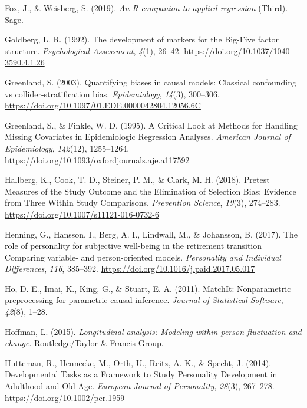 \documentclass[
  english,
  man, noextraspace]{apa7}
\begin{document}
\leavevmode\hypertarget{ref-car2019}{}%
Fox, J., \& Weisberg, S. (2019). \emph{An R companion to applied regression} (Third). Sage.

\leavevmode\hypertarget{ref-goldbergDevelopmentMarkersBigFive1992}{}%
Goldberg, L. R. (1992). The development of markers for the Big-Five factor structure. \emph{Psychological Assessment}, \emph{4}(1), 26--42. \url{https://doi.org/10.1037/1040-3590.4.1.26}

\leavevmode\hypertarget{ref-greenlandQuantifyingBiasesCausal2003}{}%
Greenland, S. (2003). Quantifying biases in causal models: Classical confounding vs collider-stratification bias. \emph{Epidemiology}, \emph{14}(3), 300--306. \url{https://doi.org/10.1097/01.EDE.0000042804.12056.6C}

\leavevmode\hypertarget{ref-greenlandCriticalLookMethods1995}{}%
Greenland, S., \& Finkle, W. D. (1995). A Critical Look at Methods for Handling Missing Covariates in Epidemiologic Regression Analyses. \emph{American Journal of Epidemiology}, \emph{142}(12), 1255--1264. \url{https://doi.org/10.1093/oxfordjournals.aje.a117592}

\leavevmode\hypertarget{ref-hallbergPretestMeasuresStudy2018}{}%
Hallberg, K., Cook, T. D., Steiner, P. M., \& Clark, M. H. (2018). Pretest Measures of the Study Outcome and the Elimination of Selection Bias: Evidence from Three Within Study Comparisons. \emph{Prevention Science}, \emph{19}(3), 274--283. \url{https://doi.org/10.1007/s11121-016-0732-6}

\leavevmode\hypertarget{ref-henningRolePersonalitySubjective2017}{}%
Henning, G., Hansson, I., Berg, A. I., Lindwall, M., \& Johansson, B. (2017). The role of personality for subjective well-being in the retirement transition Comparing variable- and person-oriented models. \emph{Personality and Individual Differences}, \emph{116}, 385--392. \url{https://doi.org/10.1016/j.paid.2017.05.017}

\leavevmode\hypertarget{ref-MatchIt2011}{}%
Ho, D. E., Imai, K., King, G., \& Stuart, E. A. (2011). MatchIt: Nonparametric preprocessing for parametric causal inference. \emph{Journal of Statistical Software}, \emph{42}(8), 1--28.

\leavevmode\hypertarget{ref-hoffmanLongitudinalAnalysisModeling2015}{}%
Hoffman, L. (2015). \emph{Longitudinal analysis: Modeling within-person fluctuation and change}. Routledge/Taylor \& Francis Group.

\leavevmode\hypertarget{ref-huttemanDevelopmentalTasksFramework2014}{}%
Hutteman, R., Hennecke, M., Orth, U., Reitz, A. K., \& Specht, J. (2014). Developmental Tasks as a Framework to Study Personality Development in Adulthood and Old Age. \emph{European Journal of Personality}, \emph{28}(3), 267--278. \url{https://doi.org/10.1002/per.1959}
\end{document}

